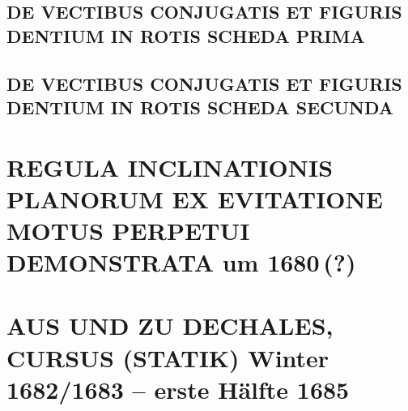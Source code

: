 \documentclass[%
fontsize=10pt,
]{scrbook}
\DeclareRobustCommand{\bracks}[1]{%
\textup{\lbrack}#1\textup{\rbrack}}
\begin{document}
\label{intro_vectibus-conjugatis}


\section[tocentry={De vectibus conjugatis et figuris dentium in rotis scheda prima},  	%
head={De vectibus conjugatis et figuris dentium in rotis scheda prima}]%
{\MakeUppercase{De vectibus conjugatis et figuris dentium in rotis scheda prima}}  	%

\label{57034}


\section[tocentry={De vectibus conjugatis et figuris dentium in rotis scheda secunda},  	%
head={De vectibus conjugatis et figuris dentium in rotis scheda secunda}]%
{\MakeUppercase{De vectibus conjugatis et figuris dentium in rotis scheda secunda}}  	%

\label{57035}






\chapter[tocentry={Regula inclinationis planorum ex evitatione motus perpetui demonstrata
\enskip \bracks{um 1680\,(?)}},
head={Regula inclinationis planorum}]
{\MakeUppercase{Regula inclinationis planorum ex evitatione motus perpetui demonstrata}
\newline \bracks{um 1680\,(?)}%
}

\label{60129}






\chapter[tocentry={Aus und zu Dechales, Cursus (Statik)
\enskip\bracks{Winter 1682/1683 -- erste Hälfte 1685}},
head={Aus und zu Dechales, Cursus (Statik)}]%
{\MakeUppercase{Aus und zu Dechales, Cursus (Statik)}
\newline \bracks{Winter 1682/1683 -- erste Hälfte 1685}}
\label{41182-2}
 
\end{document}
